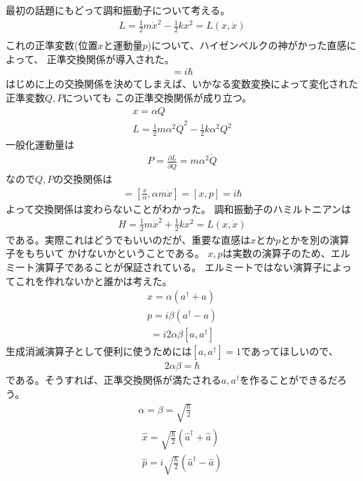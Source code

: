 \documentclass{jsarticle}
\begin{document}
最初の話題にもどって調和振動子について考える。
\begin{gather*}
  L = \frac{1}{2} m \dot{x}^2 - \frac{1}{2} k x^2 = L(x,\dot{x})\\
\end{gather*}
これの正準変数(位置$x$と運動量$p$)について、ハイゼンベルクの神がかった直感によって、
正準交換関係が導入された。
\begin{gather*}
  [x,p] = i \hbar 
\end{gather*}
はじめに上の交換関係を決めてしまえば、いかなる変数変換によって変化された正準変数$Q,P$についても
この正準交換関係が成り立つ。
\begin{gather*}
  x = \alpha Q\\
  L = \frac{1}{2} m \alpha ^2 \dot{Q} ^2 - \frac{1}{2} k \alpha ^2 Q^2
\end{gather*}
一般化運動量は
\begin{gather*}
  P = \frac{\partial L}{\partial \dot{Q}} = m \alpha ^2 \dot{Q}
\end{gather*}
なので$Q,P$の交換関係は
\begin{gather*}
  [Q,P] = [\frac{x}{\alpha} , \alpha m \dot{x}] = [x,p] = i \hbar
\end{gather*}
よって交換関係は変わらないことがわかった。
調和振動子のハミルトニアンは
\begin{gather*}
  H = \frac{1}{2} m \dot{x}^2 + \frac{1}{2} k x^2 = L(x,\dot{x})
\end{gather*}
である。実際これはどうでもいいのだが、重要な直感は$x$とか$p$とかを別の演算子をもちいて
かけないかということである。
$x,p$は実数の演算子のため、エルミート演算子であることが保証されている。
エルミートではない演算子によってこれを作れないかと誰かは考えた。
\begin{gather*}
  x = \alpha (a^\dagger + a)\\
  p = i \beta (a^\dagger - a)
\end{gather*}
\begin{gather*}
  [x,p] = i2\alpha \beta [a,a^\dagger]
\end{gather*}
生成消滅演算子として便利に使うためには$[a,a^\dagger]=1$であってほしいので、
\begin{gather*}
  2 \alpha \beta = \hbar
\end{gather*}
である。そうすれば、正準交換関係が満たされる$a,a^\dagger$を作ることができるだろう。
\begin{gather*}
  \alpha = \beta = \sqrt{\frac{\hbar}{2}}\\[10pt]
  \begin{aligned}
    \hat{x} = \sqrt{\frac{\hbar}{2}} \left( \hat{a}^\dagger + \hat{a}  \right)\\
    \hat{p} = i \sqrt{\frac{\hbar}{2}} \left( \hat{a}^\dagger - \hat{a}  \right)
  \end{aligned}
\end{gather*}
\end{document}
